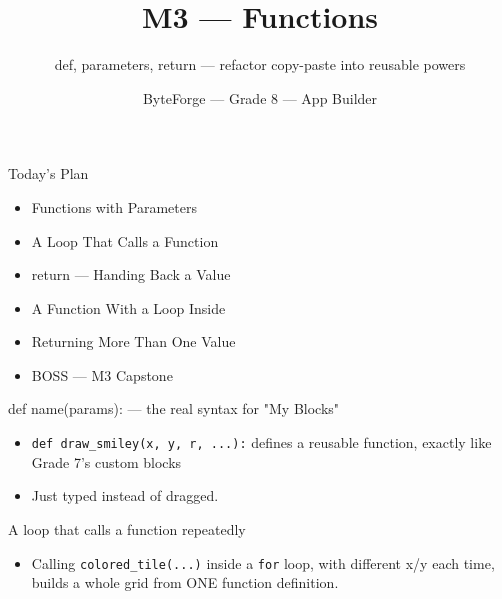 \documentclass[aspectratio=169]{beamer}
\title{M3 — Functions}
\subtitle{def, parameters, return — refactor copy-paste into reusable powers}
\author{ByteForge --- Grade 8 --- App Builder}
\date{}
\begin{document}
\begin{frame}
    \titlepage
\end{frame}

\begin{frame}{Today's Plan}
    \begin{itemize}
        \item Functions with Parameters
        \item A Loop That Calls a Function
        \item return — Handing Back a Value
        \item A Function With a Loop Inside
        \item Returning More Than One Value
        \item[$\bigstar$] BOSS --- M3 Capstone
    \end{itemize}
\end{frame}

\begin{frame}{def name(params): — the real syntax for "My Blocks"}
    \large
    \begin{itemize}
        \item \texttt{def draw\_smiley(x, y, r, ...):} defines a reusable function, exactly like Grade 7's custom blocks
        \item Just typed instead of dragged.
    \end{itemize}

    \begin{center}
    \end{center}
\end{frame}


\begin{frame}{A loop that calls a function repeatedly}
    \large
    \begin{itemize}
        \item Calling \texttt{colored\_tile(...)} inside a \texttt{for} loop, with different x/y each time, builds a whole grid from ONE function definition.
    \end{itemize}
\end{frame}
\end{document}

